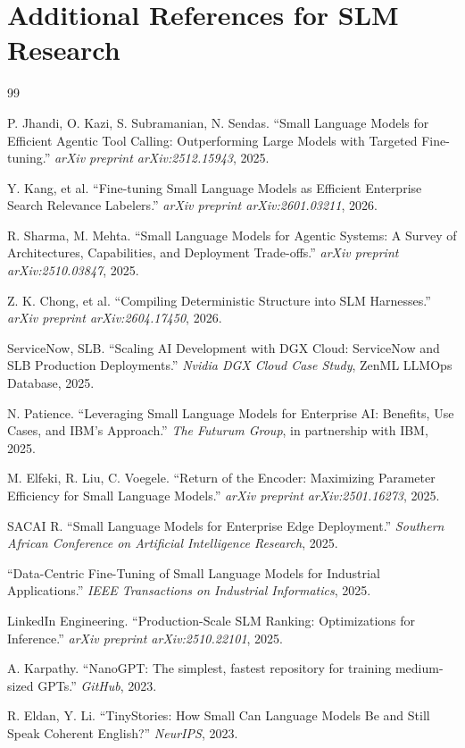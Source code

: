\documentclass[11pt]{article}
\begin{document}
\section{Additional References for SLM Research}
\begin{thebibliography}{99}

P. Jhandi, O. Kazi, S. Subramanian, N. Sendas.
``Small Language Models for Efficient Agentic Tool Calling: Outperforming Large Models with Targeted Fine-tuning.''
\textit{arXiv preprint arXiv:2512.15943}, 2025.

Y. Kang, et al.
``Fine-tuning Small Language Models as Efficient Enterprise Search Relevance Labelers.''
\textit{arXiv preprint arXiv:2601.03211}, 2026.

R. Sharma, M. Mehta.
``Small Language Models for Agentic Systems: A Survey of Architectures, Capabilities, and Deployment Trade-offs.''
\textit{arXiv preprint arXiv:2510.03847}, 2025.

Z. K. Chong, et al.
``Compiling Deterministic Structure into SLM Harnesses.''
\textit{arXiv preprint arXiv:2604.17450}, 2026.

ServiceNow, SLB.
``Scaling AI Development with DGX Cloud: ServiceNow and SLB Production Deployments.''
\textit{Nvidia DGX Cloud Case Study}, ZenML LLMOps Database, 2025.

N. Patience.
``Leveraging Small Language Models for Enterprise AI: Benefits, Use Cases, and IBM's Approach.''
\textit{The Futurum Group}, in partnership with IBM, 2025.

M. Elfeki, R. Liu, C. Voegele.
``Return of the Encoder: Maximizing Parameter Efficiency for Small Language Models.''
\textit{arXiv preprint arXiv:2501.16273}, 2025.

SACAI R.
``Small Language Models for Enterprise Edge Deployment.''
\textit{Southern African Conference on Artificial Intelligence Research}, 2025.

``Data-Centric Fine-Tuning of Small Language Models for Industrial Applications.''
\textit{IEEE Transactions on Industrial Informatics}, 2025.

LinkedIn Engineering.
``Production-Scale SLM Ranking: Optimizations for Inference.''
\textit{arXiv preprint arXiv:2510.22101}, 2025.

A. Karpathy.
``NanoGPT: The simplest, fastest repository for training medium-sized GPTs.''
\textit{GitHub}, 2023.

R. Eldan, Y. Li.
``TinyStories: How Small Can Language Models Be and Still Speak Coherent English?''
\textit{NeurIPS}, 2023.

\end{thebibliography}
\end{document}
